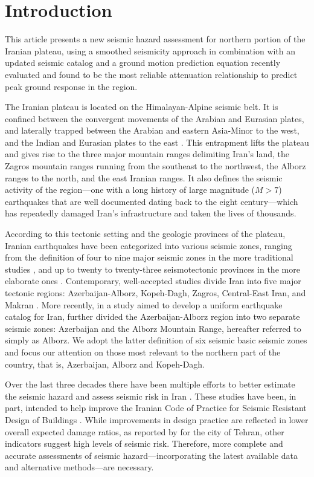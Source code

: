 
\section{Introduction}

This article presents a new seismic hazard assessment for northern portion of the Iranian plateau, using a smoothed seismicity approach in combination with an updated seismic catalog and a ground motion prediction equation recently evaluated and found to be the most reliable attenuation relationship to predict peak ground response in the region. 

The Iranian plateau is located on the Himalayan-Alpine seismic belt. It is confined between the convergent movements of the Arabian and Eurasian plates, and laterally trapped between the Arabian and eastern Asia-Minor to the west, and the Indian and Eurasian plates to the east \citep{Berberian_1981_Chap}. This entrapment lifts the plateau and gives rise to the three major mountain ranges delimiting Iran's land, the Zagros mountain ranges running from the southeast to the northwest, the Alborz ranges to the north, and the east Iranian ranges. It also defines the seismic activity of the region---one with a long history of large magnitude ($M>7$) earthquakes that are well documented dating back to the eight century---which has repeatedly damaged Iran's infrastructure and taken the lives of thousands. 

According to this tectonic setting and the geologic provinces of the plateau, Iranian earthquakes have been categorized into various seismic zones, ranging from the definition of four to nine major seismic zones in the more traditional studies \citep[e.g.,][]{Stocklin1968, Takin1972, Berberian1976}, and up to twenty to twenty-three seismotectonic provinces in the more elaborate ones \citep[e.g.,][]{Nowroozi1976, Tavakoli1999}. Contemporary, well-accepted studies divide Iran into five major tectonic regions: Azerbaijan-Alborz, Kopeh-Dagh, Zagros, Central-East Iran, and Makran \citep[e.g.,][]{Mirzaei1998}. More recently, in a study aimed to develop a uniform earthquake catalog for Iran, \citet{Karimiparidari2013} further divided the Azerbaijan-Alborz region into two separate seismic zones: Azerbaijan and the Alborz Mountain Range, hereafter referred to simply as Alborz. We adopt the latter definition of six seismic basic seismic zones and focus our attention on those most relevant to the northern part of the country, that is, Azerbaijan, Alborz and Kopeh-Dagh.

Over the last three decades there have been multiple efforts to better estimate the seismic hazard and assess seismic risk in Iran \citep[e.g.,][]{Tavakoli1999, Moinfar_2000_Chap, Ghodrati2003, Moinfar_2012_WCEE}. These studies have been, in part, intended to help improve the Iranian Code of Practice for Seismic Resistant Design of Buildings \citep{BHRC2014}. While improvements in design practice are reflected in lower overall expected damage ratios, as reported by \citet{Ghodrati2013} for the city of Tehran, other indicators suggest high levels of seismic risk. Therefore, more complete and accurate assessments of seismic hazard---incorporating the latest available data and alternative methods---are necessary.

